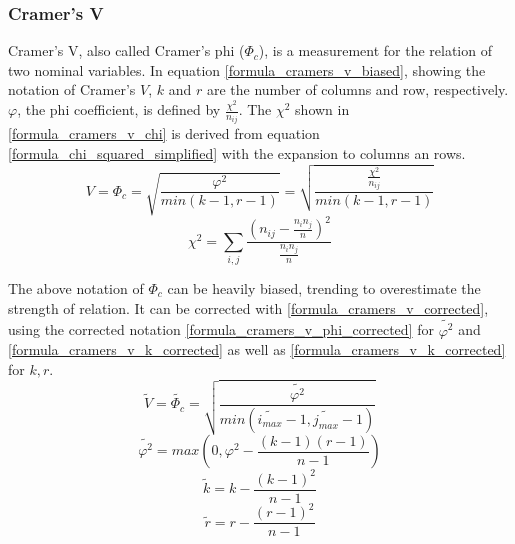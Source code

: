 \documentclass[a4paper,12pt]{report}
\begin{document}
\subsubsection{Cramer’s V}

Cramer’s V, also called Cramer's phi ($\Phi_c$), is a measurement for the relation of two nominal variables. In equation \ref{formula_cramers_v_biased}, showing the notation of Cramer’s $V$, $k$ and $r$ are the number of columns and row, respectively. $\varphi$, the phi coefficient, is defined by $\frac{{\chi^2}}{n_{ij}}$. The $\chi^2$ shown in \ref{formula_cramers_v_chi} is derived from equation \ref{formula_chi_squared_simplified} with the expansion to columns an rows. \cite{Sheskin1997,Bergsma2013}
\smallskip
\begin{equation}
\label{formula_cramers_v_biased}
	V = \Phi_c =  \sqrt{\frac{{\varphi^2}}{min(k-1,r-1)}} = \sqrt{\frac{\frac{{\chi^2}}{n_{ij}}}{min(k-1,r-1)}}
\end{equation}
\begin{equation}
\label{formula_cramers_v_chi}
	\chi^2 =  \sum_{i,j}{\frac{(n_{ij}-\frac{n_i n_j}{n})^2}{\frac{n_i n_j}{n}}}
\end{equation}

\smallskip

The above notation of $\Phi_c$ can be heavily biased, trending to overestimate the strength of relation. It can be corrected with \ref{formula_cramers_v_corrected}, using the corrected notation \ref{formula_cramers_v_phi_corrected} for $\tilde{\varphi^2}$ and \ref{formula_cramers_v_k_corrected} as well as \ref{formula_cramers_v_k_corrected} for $k,r$. \cite{Bergsma2013}
\smallskip
\begin{equation}
\label{formula_cramers_v_corrected}
	\tilde{V} = \tilde{\Phi_c} = \sqrt{\frac{\tilde{\varphi^2}}{min(\tilde{i_{max}}-1,\tilde{j_{max}}-1)}}
\end{equation}
\begin{equation}
\label{formula_cramers_v_phi_corrected}
	\tilde{\varphi^2} = max(0,\varphi^2 - \frac{(k-1)(r-1)}{n-1})
\end{equation}
\begin{equation}
\label{formula_cramers_v_k_corrected}
	\tilde{k} = k - \frac{(k-1)^2}{n-1}
\end{equation}
\begin{equation}
\label{formula_cramers_v_r_corrected}
	\tilde{r} = r - \frac{(r-1)^2}{n-1}
\end{equation}

\bigskip
\end{document}
